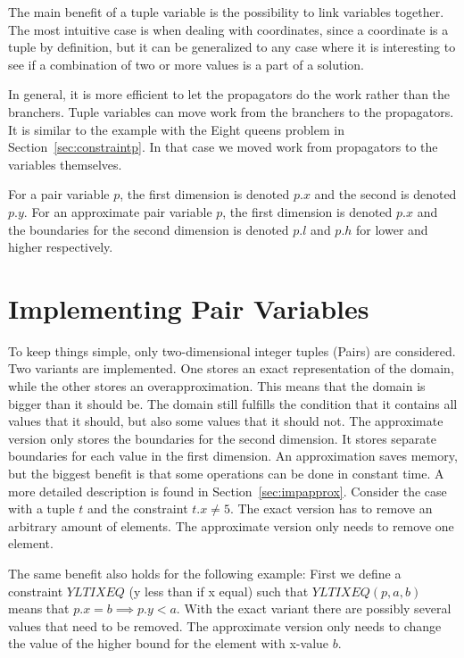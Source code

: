 \documentclass[a4paper,11pt]{article}
\begin{document}
The main benefit of a tuple variable is the possibility to link variables together. The most intuitive case is when dealing with coordinates, since a coordinate is a tuple by definition, but it can be generalized to any case where it is interesting to see if a combination of two or more values is a part of a solution. 

In general, it is more efficient to let the propagators do the work rather than the branchers. Tuple variables can move work from the branchers to the propagators. It is similar to the example with the Eight queens problem in Section~\ref{sec:constraintp}. In that case we moved work from propagators to the variables themselves.

For a pair variable $p$, the first dimension is denoted $p.x$ and the second is denoted $p.y$. For an approximate pair variable $p$, the first dimension is denoted $p.x$ and the boundaries for the second dimension is denoted $p.l$ and $p.h$ for lower and higher respectively.

\section{Implementing Pair Variables}
To keep things simple, only two-dimensional integer tuples (Pairs) are considered. Two variants are implemented. One stores an exact representation of the domain, while the other stores an overapproximation. This means that the domain is bigger than it should be. The domain still fulfills the condition that it contains all values that it should, but also some values that it should not. The approximate version only stores the boundaries for the second dimension. It stores separate boundaries for each value in the first dimension. An approximation saves memory, but the biggest benefit is that some operations can be done in constant time. A more detailed description is found in Section~\ref{sec:impapprox}. Consider the case with a tuple $t$ and the constraint $t.x\neq5$. The exact version has to remove an arbitrary amount of elements. The approximate version only needs to remove one element. 

The same benefit also holds for the following example: First we define a constraint $YLTIXEQ$ (y less than if x equal) such that $YLTIXEQ(p, a, b)$ means that $p.x=b\implies p.y<a$. With the exact variant there are possibly several values that need to be removed. The approximate version only needs to change the value of the higher bound for the element with x-value $b$.
\end{document}
